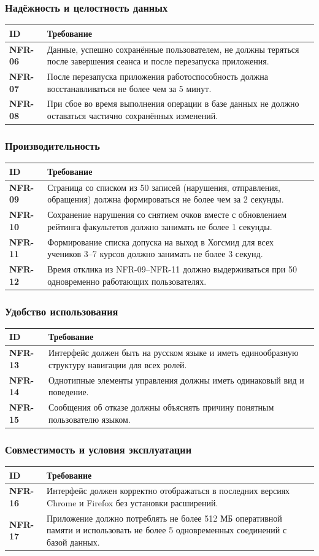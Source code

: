 \documentclass[a4paper,12pt]{article}
\newcommand{\req}[2]{\textbf{#1} & #2 \\ \hline}
\newenvironment{reqtable}{%
  \begin{longtable}{|>{\raggedright\arraybackslash}p{19mm}|>{\raggedright\arraybackslash}p{137mm}|}
  \hline
  \rowcolor{black!8}\textbf{ID} & \textbf{Требование} \\ \hline
  \endhead}{\end{longtable}}
\begin{document}
\subsubsection{Надёжность и целостность данных}
\begin{reqtable}
\req{NFR-06}{Данные, успешно сохранённые пользователем, не должны теряться после завершения сеанса и после перезапуска приложения.}
\req{NFR-07}{После перезапуска приложения работоспособность должна восстанавливаться не более чем за 5 минут.}
\req{NFR-08}{При сбое во время выполнения операции в базе данных не должно оставаться частично сохранённых изменений.}
\end{reqtable}
 
\subsubsection{Производительность}
\begin{reqtable}
\req{NFR-09}{Страница со списком из 50 записей (нарушения, отправления, обращения) должна формироваться не более чем за 2 секунды.}
\req{NFR-10}{Сохранение нарушения со снятием очков вместе с обновлением рейтинга факультетов должно занимать не более 1 секунды.}
\req{NFR-11}{Формирование списка допуска на выход в Хогсмид для всех учеников 3--7 курсов должно занимать не более 3 секунд.}
\req{NFR-12}{Время отклика из NFR-09--NFR-11 должно выдерживаться при 50 одновременно работающих пользователях.}
\end{reqtable}
 
\subsubsection{Удобство использования}
\begin{reqtable}
\req{NFR-13}{Интерфейс должен быть на русском языке и иметь единообразную структуру навигации для всех ролей.}
\req{NFR-14}{Однотипные элементы управления должны иметь одинаковый вид и поведение.}
\req{NFR-15}{Сообщения об отказе должны объяснять причину понятным пользователю языком.}
\end{reqtable}
 
\subsubsection{Совместимость и условия эксплуатации}
\begin{reqtable}
\req{NFR-16}{Интерфейс должен корректно отображаться в последних версиях Chrome и Firefox без установки расширений.}
\req{NFR-17}{Приложение должно потреблять не более 512 МБ оперативной памяти и использовать не более 5 одновременных соединений с базой данных.}
\end{reqtable}
 
\end{document}
